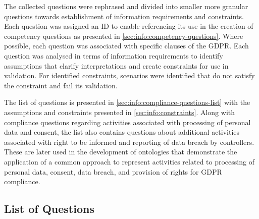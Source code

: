 The collected questions were rephrased and divided into smaller more granular questions towards establishment of information requirements and constraints. 
Each question was assigned an ID to enable referencing its use in the creation of competency questions as presented in \autoref{sec:info:competency-questions}.
Where possible, each question was associated with specific clauses of the GDPR. Each question was analysed in terms of information requirements to identify assumptions that clarify interpretations and create constraints for use in validation. For identified constraints, scenarios were identified that do not satisfy the constraint and fail its validation. 

The list of questions is presented in \autoref{sec:info:compliance-questions-list} with the assumptions and constraints presented in \autoref{sec:info:constraints}. Along with compliance questions regarding activities associated with processing of personal data and consent, the list also contains questions about additional activities associated with right to be informed and reporting of data breach by controllers. These are later used in the development of ontologies that demonstrate the application of a common approach to represent activities related to processing of personal data, consent, data breach, and provision of rights for GDPR compliance. 

\subsection{List of Questions}\label{sec:info:compliance-questions-list}
